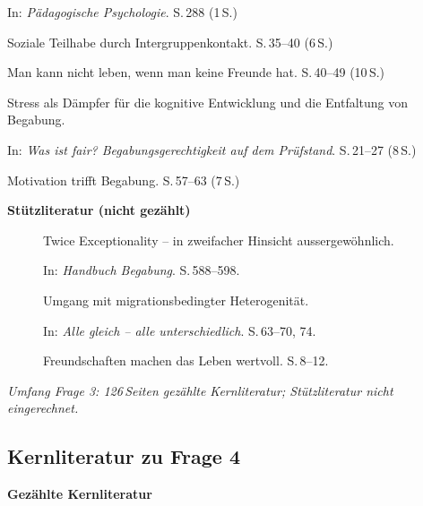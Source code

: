 \begin{description}
    In: \textit{Pädagogische Psychologie}.
    S.\,288 (1\,S.)

  \item[\cite{tschoppgruetterbuholzer2022intergruppenkontakt}] Soziale Teilhabe durch Intergruppenkontakt.
    S.\,35--40 (6\,S.)

  \item[\cite{baumert2022freundschaftwerte}] {Man kann nicht leben, wenn man keine Freunde hat}.
    S.\,40--49 (10\,S.)

  \item[\cite{evers2025stress}] Stress als Dämpfer für die kognitive Entwicklung und die Entfaltung von Begabung.
    
    In: \textit{Was ist fair? Begabungsgerechtigkeit auf dem Prüfstand}.
    S.\,21--27 (8\,S.)

  \item[\cite{lehwald2017motivation}] Motivation trifft Begabung.
    S.\,57--63 (7\,S.)

\end{description}

\textbf{Stützliteratur (nicht gezählt)}

\begin{description}
  \item[\cite{baumschader2021twice}] {Twice Exceptionality} -- in zweifacher Hinsicht aussergewöhnlich.
    
    In: \textit{Handbuch Begabung}.
    S.\,588--598.

  \item[\cite{kappus2010migration}] Umgang mit migrationsbedingter Heterogenität.
    
    In: \textit{Alle gleich -- alle unterschiedlich}.
    S.\,63--70, 74.

  \item[\cite{gysinscherzinger2022freundschaftenwertvoll}] Freundschaften machen das Leben wertvoll.
    S.\,8--12.

\end{description}

\textit{Umfang Frage 3: 126\,Seiten gezählte Kernliteratur; Stützliteratur nicht eingerechnet.}


\subsection{Kernliteratur zu Frage 4}

\textbf{Gezählte Kernliteratur}

